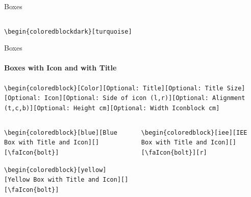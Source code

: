 \documentclass[aspectratio=169]{beamer}
\begin{document}
\begin{frame}{Boxes}
\begin{columns}
\begin{column}{0.49\textwidth}
        \end{column}
    \end{columns}

    \centering
    \begin{minipage}[t]{0.49\textwidth}
        \begin{coloredblockdark}[turquoise]
                \footnotesize\texttt{\textbackslash begin\{coloredblockdark\}[turquoise]}\strut
        \end{coloredblockdark}
        
    \end{minipage}
\end{frame}

\begin{frame}{Boxes}
    \framesubtitle{Boxes with Icon and with Title}

    \begin{coloredblock}[grey]
        \footnotesize\centering\texttt{\textbackslash begin\{coloredblock\}[Color][Optional:~Title][Optional:~Title~Size] [Optional:~Icon][Optional:~Side~of~icon (l,r)][Optional:~Alignment (t,c,b)][Optional:~Height~cm][Optional:~Width~Iconblock~cm]}
    \end{coloredblock}

    \vspace{-1cm}
    \begin{columns}
        \begin{column}{0.49\textwidth}

            \begin{coloredblockicon}
                \footnotesize\texttt{\textbackslash begin\{coloredblock\}[blue][Blue Box with Title and Icon][][\textbackslash faIcon\{bolt\}]}\strut
            \end{coloredblockicon}
    
            \begin{coloredblockicon}
                \footnotesize\texttt{\textbackslash begin\{coloredblock\}[yellow] [Yellow Box with Title and Icon][][\textbackslash faIcon\{bolt\}]}\strut
            \end{coloredblockicon}

        \end{column}
        \begin{column}{0.49\textwidth}
        
            \begin{coloredblockicon}
                \footnotesize\texttt{\textbackslash begin\{coloredblock\}[iee][IEE Box with Title and Icon][][\textbackslash faIcon\{bolt\}][r]}\strut
            \end{coloredblockicon}
    

\end{column}
\end{columns}
\end{frame}
\end{document}
